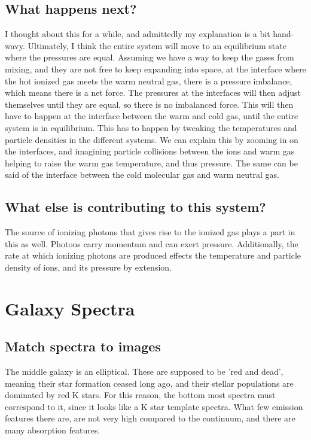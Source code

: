 \documentclass[12pt]{article}
\begin{document}
\subsection{What happens next?}
I thought about this for a while, and admittedly my explanation is a bit hand-wavy. Ultimately, I think the entire system will move to an equilibrium state where the pressures are equal. Assuming we have a way to keep the gases from mixing, and they are not free to keep expanding into space, at the interface where the hot ionized gas meets the warm neutral gas, there is a pressure imbalance, which means there is a net force. The pressures at the interfaces will then adjust themselves until they are equal, so there is no imbalanced force. This will then have to happen at the interface between the warm and cold gas, until the entire system is in equilibrium. This has to happen by tweaking the temperatures and particle densities in the different systems. We can explain this by zooming in on the interfaces, and imagining particle collisions between the ions and warm gas helping to raise the warm gas temperature, and thus pressure. The same can be said of the interface between the cold molecular gas and warm neutral gas. 

\subsection{What else is contributing to this system?}
The source of ionizing photons that gives rise to the ionized gas plays a part in this as well. Photons carry momentum and can exert pressure. Additionally, the rate at which ionizing photons are produced effects the temperature and particle density of ions, and its pressure by extension. 

\section{Galaxy Spectra}
\subsection{Match spectra to images}
The middle galaxy is an elliptical. These are supposed to be 'red and dead', meaning their star formation ceased long ago, and their stellar populations are dominated by red K stars. For this reason, the bottom most spectra must correspond to it, since it looks like a K star template spectra. What few emission features there are, are not very high compared to the continuum, and there are many absorption features.
\end{document}
